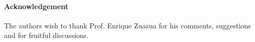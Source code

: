 \documentclass[10pt, a4]{amsart}
\theoremstyle{plain}
\theoremstyle{definition}
\theoremstyle{remark}
\numberwithin{equation}{section}
\def\to{\rightarrow}
\begin{document}










\paragraph{\bf Acknowledgement}
The authors wish to thank Prof. Enrique Zuazua  for his comments, suggestions and for fruitful discussions.
 

\end{document}
